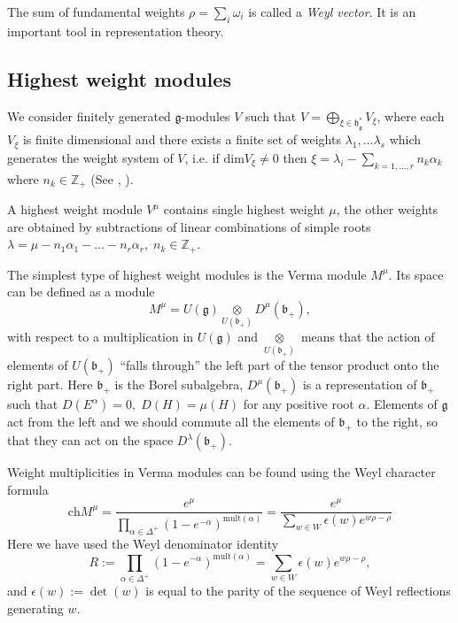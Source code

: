 \documentclass[preprint,12pt]{elsarticle}
\newcommand{\gf}{\mathfrak{g}}
\newcommand{\bff}{\mathfrak{b}}
\newcommand{\hf}{\mathfrak{h}}
\newcommand{\hfg}{\hf_{\gf}}
\begin{document}
 The sum of fundamental weights $\rho=\sum_{i} \omega_{i}$ is called a {\it Weyl vector}. It is an important tool in representation theory.

\subsection{Highest weight modules}
\label{sec:high-weight-modul}

We consider finitely generated $\gf$-modules $V$ such that $V=\bigoplus_{\xi\in \hfg^{*}} V_{\xi}$, where each $V_{\xi}$ is finite dimensional and there exists a finite set of weights $\lambda_{1},\dots \lambda_{s}$ which generates the weight system of $V$, i.e. if $\mathrm{dim}V_{\xi}\neq 0$ then $\xi=\lambda_{i}-\sum_{k=1,\dots, r} n_{k}\alpha_{k}$ where $n_{k}\in \mathbb{Z}_{+}$ (See \cite{humphreys2008representations}, \cite{carter2005lie}).

A highest weight module $V^{\mu}$ contains single highest weight $\mu$,  the other weights are obtained by subtractions of linear combinations of simple roots $\lambda=\mu-n_{1}\alpha_{1}-\dots-n_{r}\alpha_{r},\; n_{k}\in \mathbb{Z} _{+}$.

The simplest type of highest weight modules is the Verma module
$M^{\mu}$. Its space can be defined as a module
\begin{equation}
  \label{eq:17}
  M^{\mu}=U(\gf)\underset{U(\bff_{+})}{\otimes} D^{\mu}(\bff_{+}),
\end{equation}
with respect to a multiplication in $U(\gf)$ and
$\underset{U(\bff_{+})}{\otimes}$ means that the action of elements of $U(\bff_{+})$ ``falls through'' the left part of the tensor product onto the right part. Here $\bff_{+}$ is the Borel subalgebra, $D^{\mu}(\bff_{+})$ is a representation of $\bff_{+}$ such that $D(E^{\alpha})=0,\; D(H)=\mu(H)$ for any positive root $\alpha$.
Elements of $\gf$ act from the left and we should commute all the elements of $\bff_{+}$ to the right, so that they can act on the space $D^{\lambda}(\bff_{+})$.

Weight multiplicities in Verma modules can be found using the Weyl
character formula
\begin{equation}
  \label{eq:11}
  \mathrm{ch} M^{\mu}=\frac{e^{\mu}}{\prod_{\alpha\in \Delta^{+}} \left( 1-e^{-\alpha}\right)^{\mathrm{mult}(\alpha)}}=\frac{e^{\mu}}{\sum_{w\in W} \epsilon(w) e^{w\rho-\rho}}
\end{equation}
Here we have used the Weyl denominator identity
\begin{equation}
  \label{eq:12}
  R:=\prod_{\alpha\in \Delta^{+}} \left( 1-e^{-\alpha}\right)^{\mathrm{mult}(\alpha)}=\sum_{w\in W} \epsilon(w) e^{w\rho-\rho},
\end{equation}
and $\epsilon \left( w\right) :=\det \left( w\right)$ is equal to 
the parity of the sequence of Weyl reflections generating $w$.
\end{document}
